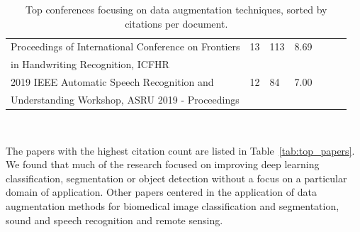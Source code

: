 \begin{table}[ht]
\begin{center}
\begin{tabular*}{\textwidth}{@{\extracolsep{\fill}}lllllll@{\extracolsep{\fill}}}
        Proceedings of International Conference on Frontiers & 13 & 113 & 8.69 \\
        \vspace{.2cm}in Handwriting Recognition, ICFHR &&& \\

        2019 IEEE Automatic Speech Recognition and & 12 & 84 & 7.00 \\
        Understanding Workshop, ASRU 2019 - Proceedings &&& \\
        \bottomrule
    \end{tabular*}
    \caption[Top conferences focusing on data augmentation techniques]{%
        Top conferences focusing on data augmentation techniques, sorted by
        citations per document.
    }~\label{tab:top_conferences}
    \end{center}
\end{table}

The papers with the highest citation count are listed in
Table~\ref{tab:top_papers}. We found that much of the research focused on
improving deep learning classification, segmentation or object detection
without a focus on a particular domain of application. Other papers centered
in the application of data augmentation methods for biomedical image
classification and segmentation, sound and speech recognition and remote
sensing.

